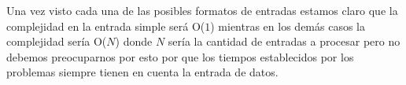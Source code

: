 Una vez visto cada una de las posibles formatos de entradas estamos claro que la complejidad en la entrada simple será O($1$) mientras en los demás casos la complejidad sería O($N$) donde $N$ sería la cantidad de entradas a procesar pero no debemos preocuparnos por esto por que los tiempos establecidos por los problemas siempre tienen en cuenta la entrada de datos.
